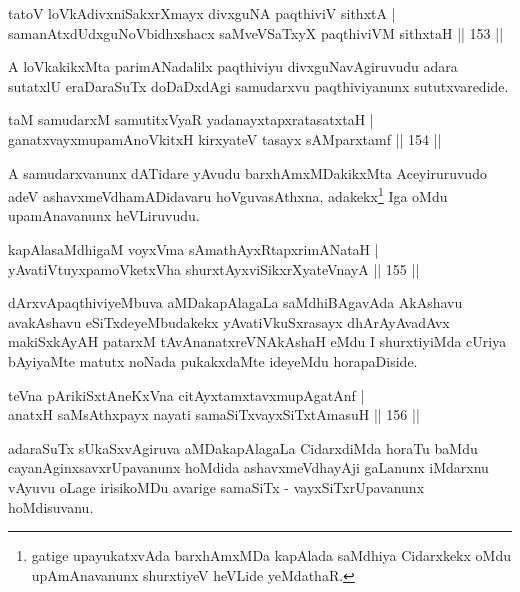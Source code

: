 \begin{shl}
tatoV loVkAdivxniSakxrXmayx divxguNA paqthiviV sithxtA |\\
samanAtxdUdxguNoV\s bidhxshacx saMveVSaTxyX paqthiviVM sithxtaH \hfill || 153 ||
\end{shl}

\begin{artha}
A loVkakikxMta parimANadalilx paqthiviyu divxguNavAgiruvudu adara sutatxlU eraDaraSuTx doDaDxdAgi samudarxvu paqthiviyanunx sututxvaredide.
\end{artha}

\begin{shl}
taM samudarxM samutitxVyaR yadanayxtapxratasatxtaH |\\
ganatxvayxmupamAnoVkitxH kirxyateV tasayx sAMparxtamf \hfill || 154 ||
\end{shl}

\begin{artha}
A samudarxvanunx dATidare yAvudu barxhAmxMDakikxMta Aceyiruruvudo adeV ashavxmeVdhamADidavaru hoVguvasAthxna, adakekx\footnote{gatige upayukatxvAda barxhAmxMDa  kapAlada saMdhiya Cidarxkekx oMdu upAmAnavanunx shurxtiyeV heVLide yeMdathaR.} Iga oMdu upamAnavanunx heVLiruvudu.
\end{artha}

\begin{shl}
kapAlasaMdhigaM voyxVma sAmathAyxRtapxrimANataH |\\
yAvatiVtuyxpamoVketxVha shurxtAyx\s \s viSikxrXyateV\s nayA \hfill || 155 ||
\end{shl}

\begin{artha}
dArxvApaqthiviyeMbuva aMDakapAlagaLa saMdhiBAgavAda AkAshavu avakAshavu eSiTxdeyeMbudakekx yAvatiVkuSxrasayx dhArAyAvadAvx makiSxkAyAH patarxM tAvAnanatxreVNAkAshaH eMdu I shurxtiyiMda cUriya bAyiyaMte matutx noNada pukakxdaMte ideyeMdu horapaDiside.
\end{artha}


\begin{shl}
teVna pArikiSxtAneKxVna citAyxtamxtavxmupAgatAnf |\\
anatxH saMsAthxpayx nayati samaSiTxvayxSiTxtAmasuH \hfill || 156 ||
\end{shl}

\begin{artha}
adaraSuTx sUkaSxvAgiruva aMDakapAlagaLa CidarxdiMda horaTu baMdu cayanAginxsavxrUpavanunx hoMdida ashavxmeVdhayAji gaLanunx iMdarxnu vAyuvu oLage irisikoMDu avarige samaSiTx - vayxSiTxrUpavanunx hoMdisuvanu.
\end{artha}

